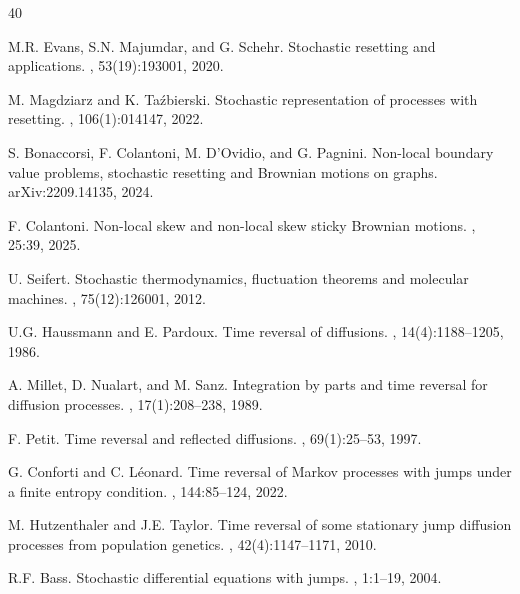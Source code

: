 \documentclass[11pt,a4paper]{article}
\theoremstyle{definition}
\theoremstyle{remark}
\begin{document}
\begin{thebibliography}{40}
	
	M.R. Evans, S.N. Majumdar, and G. Schehr.
	\newblock Stochastic resetting and applications.
	, 53(19):193001, 2020.
	
	M. Magdziarz and K. Ta\'zbierski.
	\newblock Stochastic representation of processes with resetting.
	, 106(1):014147, 2022.
	
	S. Bonaccorsi, F. Colantoni, M. D’Ovidio, and G. Pagnini.
	\newblock Non-local boundary value problems, stochastic resetting and Brownian motions on graphs.
	 arXiv:2209.14135, 2024.
	
	F. Colantoni.
	\newblock Non-local skew and non-local skew sticky Brownian motions.
	, 25:39, 2025.
	
	U. Seifert.
	\newblock Stochastic thermodynamics, fluctuation theorems and molecular machines.
	, 75(12):126001, 2012.
	
	U.G. Haussmann and E. Pardoux.
	\newblock Time reversal of diffusions.
	, 14(4):1188–1205, 1986.
	
	A. Millet, D. Nualart, and M. Sanz.
	\newblock Integration by parts and time reversal for diffusion processes.
	, 17(1):208–238, 1989.
	
	F. Petit.
	\newblock Time reversal and reflected diffusions.
	, 69(1):25–53, 1997.
	
	G. Conforti and C. L\'eonard.
	\newblock Time reversal of Markov processes with jumps under a finite entropy condition.
	, 144:85–124, 2022.
	
	M. Hutzenthaler and J.E. Taylor.
	\newblock Time reversal of some stationary jump diffusion processes from population genetics.
	, 42(4):1147–1171, 2010.
	
	R.F. Bass.
	\newblock Stochastic differential equations with jumps.
	, 1:1--19, 2004.
	

\end{thebibliography}
\end{document}
